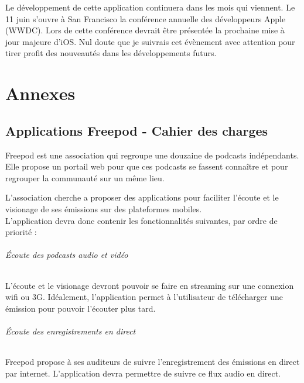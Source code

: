 \documentclass[11pt, french]{report}
\begin{document}
Le développement de cette application continuera dans les mois qui viennent. Le 11 juin s'ouvre à San Francisco la conférence annuelle des développeurs Apple (WWDC). Lors de cette conférence devrait être présentée la prochaine mise à jour majeure d'iOS. Nul doute que je suivrais cet évènement avec attention pour tirer profit des nouveautés dans les développements futurs.
 

\part*{Annexes}

\appendix

\chapter{Applications Freepod - Cahier des charges}

Freepod est une association qui regroupe une douzaine de podcasts indépendants. Elle propose un portail web pour que ces podcasts se fassent connaître et pour regrouper la communauté sur un même lieu.

L’association cherche a proposer des applications pour faciliter l’écoute et le visionage de ses émissions sur des plateformes mobiles.\\

L’application devra donc contenir les fonctionnalités suivantes, par ordre de priorité :

\paragraph{Écoute des podcasts audio et vidéo}
L’écoute et le visionage devront pouvoir se faire en streaming sur une connexion wifi ou 3G. Idéalement, l’application permet à l’utilisateur de télécharger une émission pour pouvoir l’écouter plus tard.

\paragraph{Écoute des enregistrements en direct}
Freepod propose à ses auditeurs de suivre l’enregistrement des émissions en direct par internet. L’application devra permettre de suivre ce flux audio en direct.
\end{document}
